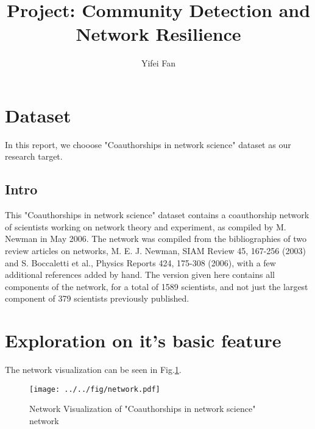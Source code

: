 \documentclass[runningheads]{llncs}
\begin{document}
%
\title{Project: Community Detection and Network Resilience}
%
%
\author{Yifei Fan}
%
%
%
\maketitle              %

\section{Dataset}
In this report, we chooose "Coauthorships in network science" dataset\cite{ref:dataset} as our research target.

\subsection{Intro}

This "Coauthorships in network science" dataset contains a coauthorship network of scientists
working on network theory and experiment, as compiled by M. Newman in May
2006.  The network was compiled from the bibliographies of two review
articles on networks, M. E. J. Newman, SIAM Review 45, 167-256 (2003) and
S. Boccaletti et al., Physics Reports 424, 175-308 (2006), with a few
additional references added by hand.  The version given here contains all
components of the network, for a total of 1589 scientists, and not just the
largest component of 379 scientists previously published.

\section{Exploration on it's basic feature}

The network visualization can be seen in Fig.\ref{fig:vis}.

\begin{figure}
    \centering
    \texttt{[image: ../../fig/network.pdf]}
    \caption{Network Visualization of "Coauthorships in network science" network} 
    \label{fig:vis}
\end{figure}
\end{document}
